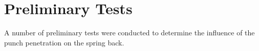 






\section{Preliminary Tests}
A number of preliminary tests were conducted to determine the influence of the punch penetration on the spring back.

